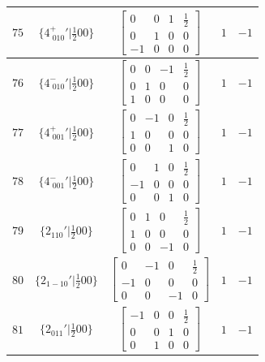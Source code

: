 \documentclass[fleqn,8pt]{jsarticle}
\begin{document}
\begin{longtable}{ccccc}
$ 75 $ & $ \{4^{+}_{\,\,010}{}'|\frac{1}{2} 0 0\} $ & $ \begin{bmatrix} 0 & 0 & 1 & \frac{1}{2} \\ 0 & 1 & 0 & 0 \\ -1 & 0 & 0 & 0 \end{bmatrix} $ & $ 1 $ & $ -1 $ \\ \hline
$ 76 $ & $ \{4^{-}_{\,\,010}{}'|\frac{1}{2} 0 0\} $ & $ \begin{bmatrix} 0 & 0 & -1 & \frac{1}{2} \\ 0 & 1 & 0 & 0 \\ 1 & 0 & 0 & 0 \end{bmatrix} $ & $ 1 $ & $ -1 $ \\ \hline
$ 77 $ & $ \{4^{+}_{\,\,001}{}'|\frac{1}{2} 0 0\} $ & $ \begin{bmatrix} 0 & -1 & 0 & \frac{1}{2} \\ 1 & 0 & 0 & 0 \\ 0 & 0 & 1 & 0 \end{bmatrix} $ & $ 1 $ & $ -1 $ \\ \hline
$ 78 $ & $ \{4^{-}_{\,\,001}{}'|\frac{1}{2} 0 0\} $ & $ \begin{bmatrix} 0 & 1 & 0 & \frac{1}{2} \\ -1 & 0 & 0 & 0 \\ 0 & 0 & 1 & 0 \end{bmatrix} $ & $ 1 $ & $ -1 $ \\ \hline
$ 79 $ & $ \{2{}_{110}{}'|\frac{1}{2} 0 0\} $ & $ \begin{bmatrix} 0 & 1 & 0 & \frac{1}{2} \\ 1 & 0 & 0 & 0 \\ 0 & 0 & -1 & 0 \end{bmatrix} $ & $ 1 $ & $ -1 $ \\ \hline
$ 80 $ & $ \{2{}_{1-10}{}'|\frac{1}{2} 0 0\} $ & $ \begin{bmatrix} 0 & -1 & 0 & \frac{1}{2} \\ -1 & 0 & 0 & 0 \\ 0 & 0 & -1 & 0 \end{bmatrix} $ & $ 1 $ & $ -1 $ \\ \hline
$ 81 $ & $ \{2{}_{011}{}'|\frac{1}{2} 0 0\} $ & $ \begin{bmatrix} -1 & 0 & 0 & \frac{1}{2} \\ 0 & 0 & 1 & 0 \\ 0 & 1 & 0 & 0 \end{bmatrix} $ & $ 1 $ & $ -1 $ \\ \hline

\end{longtable}
\end{document}
